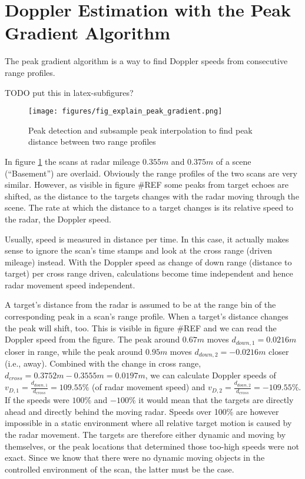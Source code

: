 \section{Doppler Estimation with the Peak Gradient
Algorithm}\label{doppler-estimation-with-the-peak-gradient-algorithm}

The peak gradient algorithm is a way to find Doppler speeds from
consecutive range profiles.

TODO put this in latex-subfigures?

\begin{figure}[htbp]
    \centering
    \label{fig:fig_explain_peak_gradient}
    \texttt{[image: figures/fig\_explain\_peak\_gradient.png]}
    \caption{Peak detection and subsample peak interpolation to find peak distance between two range profiles}
\end{figure}

In figure \ref{fig:fig_explain_peak_gradient} the scans at radar mileage \(0.355m\) and \(0.375m\) of
a scene (``Basement'') are overlaid. Obviously the range profiles of the
two scans are very similar. However, as visible in figure \#REF some
peaks from target echoes are shifted, as the distance to the targets
changes with the radar moving through the scene. The rate at which the
distance to a target changes is its relative speed to the radar, the
Doppler speed.

Usually, speed is measured in distance per time. In this case, it
actually makes sense to ignore the scan's time stamps and look at the
cross range (driven mileage) instead. With the Doppler speed as change
of down range (distance to target) per cross range driven, calculations
become time independent and hence radar movement speed independent.

A target's distance from the radar is assumed to be at the range bin of
the corresponding peak in a scan's range profile. When a target's
distance changes the peak will shift, too. This is visible in figure
\#REF and we can read the Doppler speed from the figure. The peak around
\(0.67m\) moves \(d_{down,1} = 0.0216m\) closer in range, while the peak
around \(0.95m\) moves \(d_{down,2} = -0.0216m\) closer (i.e., away).
Combined with the change in cross range,
\(d_{cross} = 0.3752m - 0.3555m = 0.0197m\), we can calculate Doppler
speeds of \(v_{D,1} = \frac{d_{down,1}}{d_{cross}} = 109.55 \%\) (of
radar movement speed) and
\(v_{D,2} = \frac{d_{down,2}}{d_{cross}} = -109.55 \%\). If the speeds
were \(100\%\) and \(-100\%\) it would mean that the targets are directly
ahead and directly behind the moving radar. Speeds over 100\% are
however impossible in a static environment where all relative target
motion is caused by the radar movement. The targets are therefore either
dynamic and moving by themselves, or the peak locations that determined
those too-high speeds were not exact. Since we know that there were no
dynamic moving objects in the controlled environment of the scan, the
latter must be the case.

